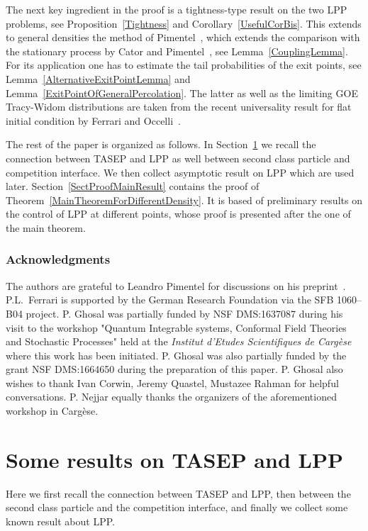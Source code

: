 \documentclass[12pt,a4paper]{article}
\numberwithin{equation}{section}
\begin{document}
The next key ingredient in the proof is a tightness-type result on the two LPP problems, see Proposition~\ref{Tightness} and Corollary~\ref{UsefulCorBis}. This extends to general densities the method of Pimentel~\cite{Pi17}, which extends the comparison with the stationary process by Cator and Pimentel~\cite{CP15b}, see Lemma~\ref{CouplingLemma}. For its application one has to estimate the tail probabilities of the exit points, see Lemma~\ref{AlternativeExitPointLemma} and Lemma~\ref{ExitPointOfGeneralPercolation}. The latter as well as the limiting GOE Tracy-Widom distributions are taken from the recent universality result for flat initial condition by Ferrari and Occelli~\cite{FO17v1}.

The rest of the paper is organized as follows. In Section~\ref{sectTASEPandLPP} we recall the connection between TASEP and LPP as well between second class particle and competition interface. We then collect asymptotic result on LPP which are used later. Section~\ref{SectProofMainResult} contains the proof of Theorem~\ref{MainTheoremForDifferentDensity}. It is based of preliminary results on the control of LPP at different points, whose proof is presented after the one of the main theorem.

\subsubsection*{Acknowledgments}
The authors are grateful to Leandro Pimentel for discussions on his preprint~\cite{Pi17}. P.L.~Ferrari is supported by the German Research Foundation via the SFB 1060--B04 project. P. Ghosal was partially funded by NSF DMS:1637087 during his visit to the workshop "Quantum Integrable systems, Conformal Field Theories and Stochastic Processes"  held at the \emph{Institut d'Etudes Scientifiques de Carg\`ese} where this work has been initiated. P. Ghosal was also partially funded by the grant NSF DMS:1664650 during the preparation of this paper. P. Ghosal also wishes to thank Ivan Corwin, Jeremy Quastel, Mustazee Rahman for helpful conversations. P. Nejjar equally thanks the organizers of the aforementioned workshop in Carg\`ese.

\section{Some results on TASEP and LPP}\label{sectTASEPandLPP}
Here we first recall the connection between TASEP and LPP, then between the second class particle and the competition interface, and finally we collect some known result about LPP.
\end{document}
